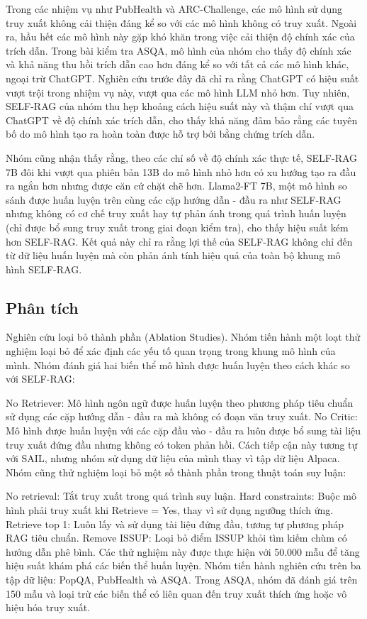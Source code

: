 \documentclass{article}
\begin{document}
Trong các nhiệm vụ như PubHealth và ARC-Challenge, các mô hình sử dụng truy xuất không cải thiện đáng kể so với các mô hình không có truy xuất. Ngoài ra, hầu hết các mô hình này gặp khó khăn trong việc cải thiện độ chính xác của trích dẫn. Trong bài kiểm tra ASQA, mô hình của nhóm cho thấy độ chính xác và khả năng thu hồi trích dẫn cao hơn đáng kể so với tất cả các mô hình khác, ngoại trừ ChatGPT. Nghiên cứu trước đây đã chỉ ra rằng ChatGPT có hiệu suất vượt trội trong nhiệm vụ này, vượt qua các mô hình LLM nhỏ hơn. Tuy nhiên, SELF-RAG của nhóm thu hẹp khoảng cách hiệu suất này và thậm chí vượt qua ChatGPT về độ chính xác trích dẫn, cho thấy khả năng đảm bảo rằng các tuyên bố do mô hình tạo ra hoàn toàn được hỗ trợ bởi bằng chứng trích dẫn.

Nhóm cũng nhận thấy rằng, theo các chỉ số về độ chính xác thực tế, SELF-RAG 7B đôi khi vượt qua phiên bản 13B do mô hình nhỏ hơn có xu hướng tạo ra đầu ra ngắn hơn nhưng được căn cứ chặt chẽ hơn. Llama2-FT 7B, một mô hình so sánh được huấn luyện trên cùng các cặp hướng dẫn - đầu ra như SELF-RAG nhưng không có cơ chế truy xuất hay tự phản ánh trong quá trình huấn luyện (chỉ được bổ sung truy xuất trong giai đoạn kiểm tra), cho thấy hiệu suất kém hơn SELF-RAG. Kết quả này chỉ ra rằng lợi thế của SELF-RAG không chỉ đến từ dữ liệu huấn luyện mà còn phản ánh tính hiệu quả của toàn bộ khung mô hình SELF-RAG.

\subsection{Phân tích}
Nghiên cứu loại bỏ thành phần (Ablation Studies). Nhóm tiến hành một loạt thử nghiệm loại bỏ để xác định các yếu tố quan trọng trong khung mô hình của mình. Nhóm đánh giá hai biến thể mô hình được huấn luyện theo cách khác so với SELF-RAG:

No Retriever: Mô hình ngôn ngữ được huấn luyện theo phương pháp tiêu chuẩn sử dụng các cặp hướng dẫn - đầu ra mà không có đoạn văn truy xuất.
No Critic: Mô hình được huấn luyện với các cặp đầu vào - đầu ra luôn được bổ sung tài liệu truy xuất đứng đầu nhưng không có token phản hồi. Cách tiếp cận này tương tự với SAIL, nhưng nhóm sử dụng dữ liệu của mình thay vì tập dữ liệu Alpaca.
Nhóm cũng thử nghiệm loại bỏ một số thành phần trong thuật toán suy luận:

No retrieval: Tắt truy xuất trong quá trình suy luận.
Hard constraints: Buộc mô hình phải truy xuất khi Retrieve = Yes, thay vì sử dụng ngưỡng thích ứng.
Retrieve top 1: Luôn lấy và sử dụng tài liệu đứng đầu, tương tự phương pháp RAG tiêu chuẩn.
Remove ISSUP: Loại bỏ điểm ISSUP khỏi tìm kiếm chùm có hướng dẫn phê bình.
Các thử nghiệm này được thực hiện với 50.000 mẫu để tăng hiệu suất khám phá các biến thể huấn luyện. Nhóm tiến hành nghiên cứu trên ba tập dữ liệu: PopQA, PubHealth và ASQA. Trong ASQA, nhóm đã đánh giá trên 150 mẫu và loại trừ các biến thể có liên quan đến truy xuất thích ứng hoặc vô hiệu hóa truy xuất.
\end{document}
